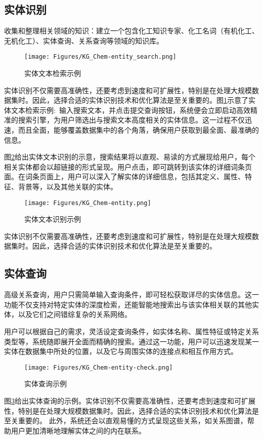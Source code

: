 \subsection{实体识别} 
收集和整理相关领域的知识：建立一个包含化工知识专家、化工名词（有机化工、无机化工）、实体查询、关系查询等领域的知识库。

\begin{figure}[h!]
	\vskip -10pt
\centering
\texttt{[image: Figures/KG\_Chem-entity\_search.png]}
\caption{\small\textrm{实体文本检索示例}}%
\label{Fig:KG-Chem_entity_search}
\end{figure}
实体识别不仅需要高准确性，还要考虑到速度和可扩展性，特别是在处理大规模数据集时。因此，选择合适的实体识别技术和优化算法是至关重要的。图\ref{Fig:KG-Chem_entity_search}示意了实体文本检索示例:~输入搜索文本，并点击提交查询按钮，系统便会立即启动高效精准的搜索引擎，为用户筛选出与搜索文本高度相关的实体信息。这一过程不仅迅速，而且全面，能够覆盖数据集中的各个角落，确保用户获取到最全面、最准确的信息。

图\ref{Fig:KG-Chem_entity}给出实体文本识别的示意，搜索结果将以直观、易读的方式展现给用户，每个相关实体都会以超链接的形式呈现。用户点击，即可跳转到该实体的详细词条页面。在词条页面上，用户可以深入了解实体的详细信息，包括其定义、属性、特征、背景等，以及其他关联的实体。

\begin{figure}[h!]
\centering
\texttt{[image: Figures/KG\_Chem-entity.png]}
\caption{\small\textrm{实体文本识别示例}}%
\label{Fig:KG-Chem_entity}
\end{figure}
实体识别不仅需要高准确性，还要考虑到速度和可扩展性，特别是在处理大规模数据集时。因此，选择合适的实体识别技术和优化算法是至关重要的。
\subsection{实体查询} 
高级关系查询，用户只需简单输入查询条件，即可轻松获取详尽的实体信息。这一功能不仅支持对特定实体的深度检索，还能智能地搜索出与该实体相关联的其他实体，以及它们之间错综复杂的关系网络。

用户可以根据自己的需求，灵活设定查询条件，如实体名称、属性特征或特定关系类型等，系统随即展开全面而精确的搜索。通过这一功能，用户可以迅速发现某一实体在数据集中所处的位置，以及它与周围实体的连接点和相互作用方式。

\begin{figure}[h!]
\centering
\texttt{[image: Figures/KG\_Chem-entity-check.png]}
\caption{\small\textrm{实体查询示例}}%
\label{Fig:KG-Chem_entity_check}
\end{figure}
图\ref{Fig:KG-Chem_entity_check}给出实体查询的示例。实体识别不仅需要高准确性，还要考虑到速度和可扩展性，特别是在处理大规模数据集时。因此，选择合适的实体识别技术和优化算法是至关重要的。
此外，系统还会以直观易懂的方式呈现这些关系，如关系图谱，帮助用户更加清晰地理解实体之间的内在联系。


